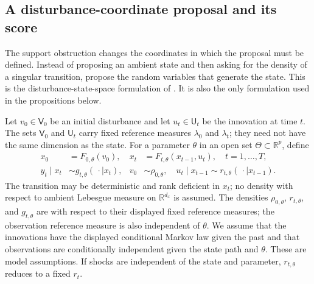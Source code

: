 \documentclass[11pt]{article}
\newcommand{\R}{\mathbb{R}}
\begin{document}
\subsection{A disturbance-coordinate proposal and its score}
\label{sec:disturbance-proposal}

The support obstruction changes the coordinates in which the proposal must be
defined. Instead of proposing an ambient state and then asking for the density
of a singular transition, propose the random variables that generate the
state. This is the disturbance-state-space formulation of
\citet[Sections 1--2]{murray2018disturbance}. It is also the only formulation
used in the propositions below.

Let $v_0\in\mathsf V_0$ be an initial disturbance and let
$u_t\in\mathsf U_t$ be the innovation at time $t$. The sets
$\mathsf V_0$ and $\mathsf U_t$ carry fixed reference measures
$\lambda_0$ and $\lambda_t$; they need not have the same dimension as the
state. For a parameter $\theta$ in an open set $\Theta\subset\R^p$, define
\begin{align}
 x_0&=F_{0,\theta}(v_0), &
 x_t&=F_{t,\theta}(x_{t-1},u_t), \quad t=1,\ldots,T,
 \label{eq:disturbance-state-map}\\
 y_t\mid x_t&\sim g_{t,\theta}(\,\cdot\mid x_t), &
 v_0&\sim\rho_{0,\theta}, \quad
 u_t\mid x_{t-1}\sim r_{t,\theta}(\,\cdot\mid x_{t-1}).
 \label{eq:disturbance-model}
\end{align}
The transition may be deterministic and rank deficient in $x_t$; no density
with respect to ambient Lebesgue measure on $\R^{d_x}$ is assumed. The
densities $\rho_{0,\theta}$, $r_{t,\theta}$, and $g_{t,\theta}$ are with
respect to their displayed fixed reference measures; the observation
reference measure is also independent of $\theta$. We assume that the
innovations have the displayed conditional Markov law given the past and
that observations are conditionally independent given the state path and
$\theta$. These are model assumptions. If shocks are independent of the state
and parameter, $r_{t,\theta}$ reduces to a fixed $r_t$.
\end{document}
